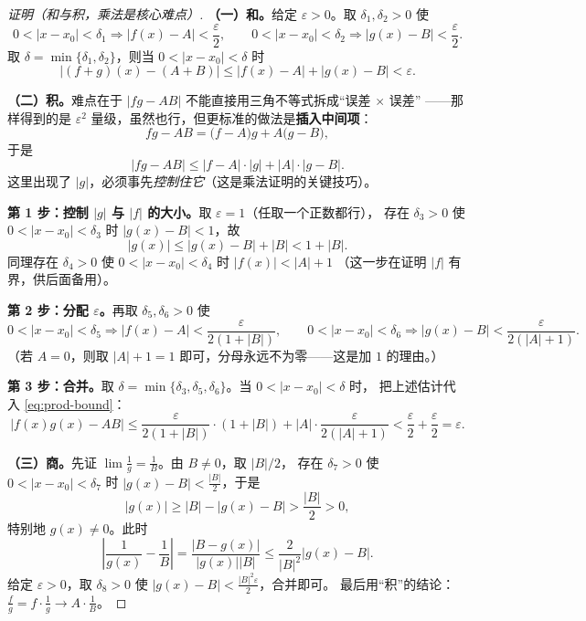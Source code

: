 \documentclass[11pt,a4paper]{ctexart}
\theoremstyle{definition}
\theoremstyle{remark}
\newcommand{\eps}{\varepsilon}
\newcommand{\abs}[1]{\left\lvert #1 \right\rvert}
\begin{document}
\begin{proof}[证明（和与积，乘法是核心难点）]
\textbf{（一）和。}给定 $\eps>0$。取 $\delta_1,\delta_2>0$ 使
\[
  0<\abs{x-x_0}<\delta_1\Rightarrow\abs{f(x)-A}<\frac\eps2,\qquad
  0<\abs{x-x_0}<\delta_2\Rightarrow\abs{g(x)-B}<\frac\eps2 .
\]
取 $\delta=\min\{\delta_1,\delta_2\}$，则当 $0<\abs{x-x_0}<\delta$ 时
\[
  \abs{(f+g)(x)-(A+B)}\le\abs{f(x)-A}+\abs{g(x)-B}<\eps .
\]

\textbf{（二）积。}难点在于 $\abs{fg-AB}$ 不能直接用三角不等式拆成“误差 $\times$ 误差”
——那样得到的是 $\eps^2$ 量级，虽然也行，但更标准的做法是\textbf{插入中间项}：
\[
  fg-AB=\bigl(f-A\bigr)g+A\bigl(g-B\bigr),
\]
于是
\begin{equation}\label{eq:prod-bound}
  \abs{fg-AB}\le\abs{f-A}\cdot\abs{g}+\abs{A}\cdot\abs{g-B}.
\end{equation}
这里出现了 $\abs{g}$，必须事先\emph{控制住它}（这是乘法证明的关键技巧）。

\textbf{第 1 步：控制 $\abs g$ 与 $\abs f$ 的大小。}取 $\eps=1$（任取一个正数都行），
存在 $\delta_3>0$ 使 $0<\abs{x-x_0}<\delta_3$ 时 $\abs{g(x)-B}<1$，故
\[
  \abs{g(x)}\le\abs{g(x)-B}+\abs B<1+\abs B .
\]
同理存在 $\delta_4>0$ 使 $0<\abs{x-x_0}<\delta_4$ 时 $\abs{f(x)}<\abs A+1$
（这一步在证明 $\abs{f}$ 有界，供后面备用）。

\textbf{第 2 步：分配 $\eps$。}再取 $\delta_5,\delta_6>0$ 使
\[
  0<\abs{x-x_0}<\delta_5\Rightarrow\abs{f(x)-A}<\frac{\eps}{2(1+\abs B)},\qquad
  0<\abs{x-x_0}<\delta_6\Rightarrow\abs{g(x)-B}<\frac{\eps}{2(\abs A+1)} .
\]
（若 $A=0$，则取 $\abs A+1=1$ 即可，分母永远不为零——这是加 $1$ 的理由。）

\textbf{第 3 步：合并。}取 $\delta=\min\{\delta_3,\delta_5,\delta_6\}$。当 $0<\abs{x-x_0}<\delta$ 时，
把上述估计代入 \eqref{eq:prod-bound}：
\[
  \abs{f(x)g(x)-AB}
  \le\frac{\eps}{2(1+\abs B)}\cdot(1+\abs B)+\abs A\cdot\frac{\eps}{2(\abs A+1)}
  <\frac\eps2+\frac\eps2=\eps .
\]

\textbf{（三）商。}先证 $\lim\frac{1}{g}=\frac1B$。由 $B\neq0$，取 $\abs B/2$，
存在 $\delta_7>0$ 使 $0<\abs{x-x_0}<\delta_7$ 时 $\abs{g(x)-B}<\frac{\abs B}{2}$，于是
\[
  \abs{g(x)}\ge\abs B-\abs{g(x)-B}>\frac{\abs B}{2}>0,
\]
特别地 $g(x)\neq0$。此时
\[
  \abs{\frac{1}{g(x)}-\frac1B}=\frac{\abs{B-g(x)}}{\abs{g(x)}\abs B}
  \le\frac{2}{\abs B^{2}}\abs{g(x)-B} .
\]
给定 $\eps>0$，取 $\delta_8>0$ 使 $\abs{g(x)-B}<\frac{\abs B^{2}\eps}{2}$，合并即可。
最后用“积”的结论：$\frac fg=f\cdot\frac1g\to A\cdot\frac1B$。

\end{proof}
\end{document}
